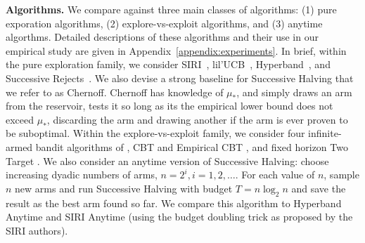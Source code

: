 

\textbf{Algorithms.}
We compare against three main
classes of algorithms: (1) pure exporation algorithms, (2)
explore-vs-exploit algorithms, and (3) anytime algorthms.  Detailed
descriptions of these algorithms and their use in our empirical study
are given in Appendix~\ref{appendix:experiments}.  In brief, within
the pure exploration family, we consider
SIRI~\citep{DBLP:journals/corr/CarpentierV15},
lil'UCB~\citep{Jamieson2014lilU}, Hyperband~\citep{li2017hyperband},
and Successive Rejects~\citep{audibert2010best}.  We also devise a
strong baseline for Successive Halving that we refer to as Chernoff.
Chernoff has knowledge of $\mu_*$, and simply draws an arm from the
reservoir, tests it so long as its the empirical lower bound does not
exceed $\mu_*$, discarding the arm and drawing another if the arm is
ever proven to be suboptimal.  Within the explore-vs-exploit family,
we consider four infinite-armed bandit algorithms of \cite{berry1997}, CBT
and Empirical CBT \citep{Chan2018Infinite}, and fixed horizon Two
Target \citep{bonald2013two}.  We also consider an anytime version of Successive Halving:
choose increasing dyadic numbers of arms, $n=2^i, i=1,2,\dots$.  For each value of $n$,
sample $n$ new arms and run Successive Halving with budget $T=n\log_2
n$ and save the result as the best arm found so far.  We compare this
algorithm to Hyperband Anytime and SIRI Anytime (using the budget
doubling trick as proposed by the SIRI authors).

